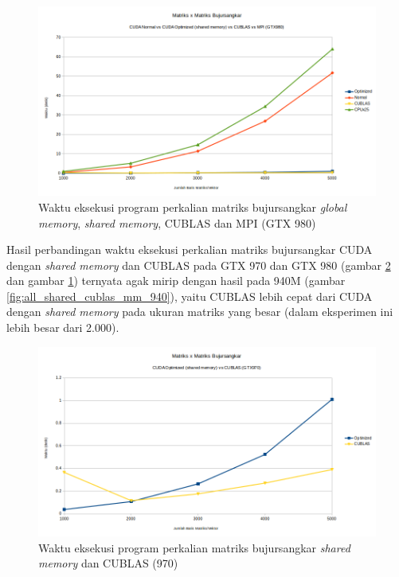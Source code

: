\begin{figure}
	\centering
	\includegraphics[width=1\textwidth]
	{pics/all_mm_980}
	\caption{Waktu eksekusi program perkalian matriks bujursangkar \textit{global memory}, \textit{shared memory}, CUBLAS dan MPI (GTX 980)}
	\label{fig:all_mm_980}
\end{figure} 

Hasil perbandingan waktu eksekusi perkalian matriks bujursangkar CUDA dengan \textit{shared memory} dan CUBLAS pada GTX 970 dan GTX 980 (gambar \ref{fig:all_shared_cublas_mm_970} dan gambar \ref{fig:all_mm_980}) ternyata agak mirip dengan hasil pada 940M (gambar \ref{fig:all_shared_cublas_mm_940}), yaitu CUBLAS lebih cepat dari CUDA dengan \textit{shared memory} pada ukuran matriks yang besar (dalam eksperimen ini lebih besar dari 2.000).

\begin{figure}
	\centering
	\includegraphics[width=1\textwidth]
	{pics/all_shared_cublas_mm_970}
	\caption{Waktu eksekusi program perkalian matriks bujursangkar \textit{shared memory} dan CUBLAS (970)}
	\label{fig:all_shared_cublas_mm_970}
\end{figure} 

